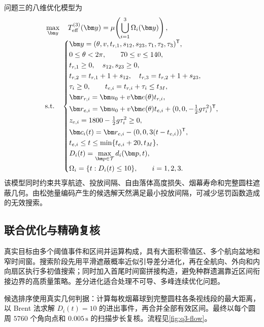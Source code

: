 问题三的八维优化模型为
\begin{equation}
\begin{aligned}
&\max_{\bm y}\quad T_{\mathrm{eff}}^{(3)}(\bm y)
=\mu\!\left(\bigcup_{i=1}^{3}\Omega_i(\bm y)\right),\\[-1mm]
&\text{\rm s.t.}\quad
\left\{\begin{aligned}
&\bm y=(\theta,v,t_{r,1},s_{12},s_{23},\tau_1,\tau_2,\tau_3)^{\mathsf T},\\
&0\le\theta<2\pi,\qquad 70\le v\le140,\\
&t_{r,1}\ge0,\quad s_{12},s_{23}\ge0,\\
&t_{r,2}=t_{r,1}+1+s_{12},\quad t_{r,3}=t_{r,2}+1+s_{23},\\
&\tau_i\ge0,\qquad t_{e,i}=t_{r,i}+\tau_i\le t_M,\\
&\bm r_{r,i}=\bm u_0+v\bm e(\theta)t_{r,i},\\
&\bm r_{e,i}=\bm u_0+v\bm e(\theta)t_{e,i}+(0,0,-\tfrac12g\tau_i^2)^{\mathsf T},\\
&z_{e,i}=1800-\tfrac12g\tau_i^2\ge0,\\
&\bm c_i(t)=\bm r_{e,i}-(0,0,3(t-t_{e,i}))^{\mathsf T},\\
&t_{e,i}\le t\le\min\{t_{e,i}+20,t_M\},\\
&D_i(t)=\displaystyle\max_{\bm p\in\mathcal T}d_i(\bm p,t),\\
&\Omega_i=\{t:D_i(t)\le10\},\qquad i=1,2,3.
\end{aligned}\right.
\end{aligned}
\label{eq:q3-complete-model}
\end{equation}
该模型同时约束共享航迹、投放间隔、自由落体高度损失、烟幕寿命和完整圆柱遮蔽几何。由松弛量编码产生的候选解天然满足最小投放间隔，可减少惩罚函数造成的无效搜索。

\subsection{联合优化与精确复核}

真实目标由多个阈值事件和区间并运算构成，具有大面积零值区、多个航向盆地和窄时间窗。搜索阶段先用平滑遮蔽概率近似引导差分进化，再在全航向、外向和内向扇区执行多初值搜索；同时加入首尾时间窗拼接构造，避免种群遗漏靠近区间衔接边界的高质量策略。差分进化适合处理不可导、多峰连续优化问题\cite{storn1997de}。

候选排序使用真实几何判据：计算每枚烟幕球到完整圆柱各条视线段的最大距离，以 Brent 法求解 $D_i(t)=10$ 的进出事件\cite{brent1973algorithms}，再合并全部有效区间。最终以每个圆周 $5760$ 个角向点和 $0.005\,\mathrm{s}$ 的扫描步长复核。流程见\cref{fig:q3-flow}。

